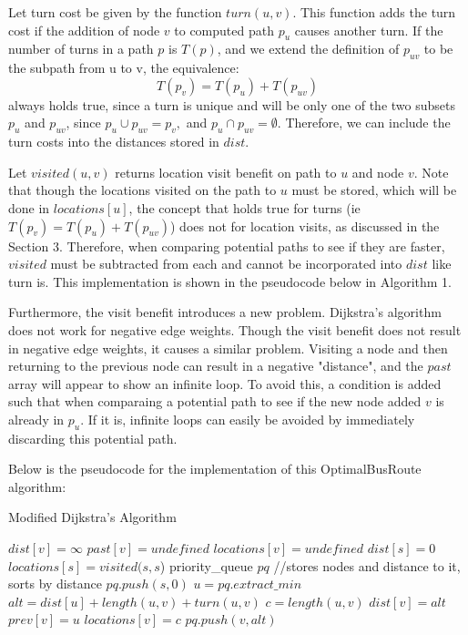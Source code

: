 \documentclass[letter,10pt]{article}
\begin{document}
Let turn cost be given by the function $turn(u,v)$. This function adds the turn cost if the addition of node $v$ to computed path $p_u$ causes another turn. If the number of turns in a path $p$ is $T(p)$, and we extend the definition of $p_{uv}$ to be the subpath from u to v, the equivalence:
$$T(p_v) = T(p_u) + T(p_{uv})$$
always holds true, since a turn is unique and will be only one of the two subsets $p_u$ and $p_{uv}$, since $p_u \cup p_{uv} = p_v,$ and $ p_u \cap p_{uv} = \emptyset$. Therefore, we can include the turn costs into the distances stored in $dist$. 

Let $visited(u,v)$ returns location visit benefit on path to $u$ and node $v$. Note that though the locations visited on the path to $u$ must be stored, which will be done in $locations[u]$, the concept that holds true for turns (ie $T(p_v) = T(p_u) + T(p_{uv})$) does not for location visits, as discussed in the Section 3. Therefore, when comparing potential paths to see if they are faster, $visited$ must be subtracted from each and cannot be incorporated into $dist$ like turn is. This implementation is shown in the pseudocode below in Algorithm 1.

Furthermore, the visit benefit introduces a new problem. Dijkstra's algorithm does not work for negative edge weights. Though the visit benefit does not result in negative edge weights, it causes a similar problem. Visiting a node and then returning to the previous node can result in a negative "distance", and the $past$ array will appear to show an infinite loop. To avoid this, a condition is added such that when comparaing a potential path to see if the new node added $v$ is already in $p_u$. If it is, infinite loops can easily be avoided by immediately discarding this potential path.

Below is the pseudocode for the implementation of this OptimalBusRoute algorithm: 

\newpage
\begin{algorithm*}
\caption{Modified Dijkstra's Algorithm}\label{euclid}
\begin{algorithmic}[1]
\State $dist[v] = \infty$
\State $past[v] = undefined$
\State $locations[v] = undefined$
\EndFor
\State
\State $dist[s] = 0$
\State $locations[s] = visited(s,s$) 
\State priority\_queue $pq$ //stores nodes and distance to it, sorts by distance
\State $pq.push(s, 0)$
\State
{} 
\State $u = pq.extract\_min$
\State $alt = dist[u] + length(u, v) + turn(u, v)$ 
\State $c = length(u, v)$
\State $dist[v] = alt$
\State $prev[v] = u$
\State $locations[v] = c$
\State $pq.push(v, alt)$
\EndIf
\EndFor
\EndWhile
\EndProcedure
\end{algorithmic}
\end{algorithm*}
\end{document}
